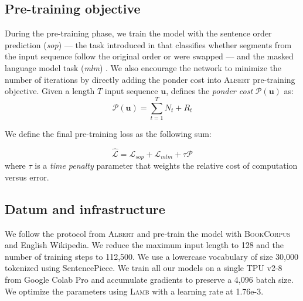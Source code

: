 \subsection{Pre-training objective}

During the pre-training phase, we train the model with the sentence order prediction (\textit{sop}) — the task introduced in \textcite{lan_20} that classifies whether segments from the input sequence follow the original order or were swapped — and the masked language model task (\textit{mlm}) \parencite{devlin_19}. We also encourage the network to minimize the number of iterations by directly adding the ponder cost into \textsc{Albert}  pre-training objective. Given a length $T$ input sequence $\textbf{u}$,  \textcite{graves_16} defines the \emph{ponder cost} $\mathcal{P}(\textbf{u})$ as:
\begin{equation}
\mathcal{P}(\textbf{u}) = \sum_{t=1}^T N_{t} + R_t \label{eq:ponder-cost}
\end{equation}

We define the final pre-training loss as the following sum:

\begin{equation}
\hat{\mathcal{L}} = \mathcal{L}_{sop} + \mathcal{L}_{mlm} + \tau \mathcal{P} \label{eq:ponder-loss}
\end{equation}
where $\tau$ is a \emph{time penalty} parameter that weights the relative cost of computation versus error.

\subsection{Datum and infrastructure} We follow the protocol from \textsc{Albert} and pre-train the model with \textsc{BookCorpus}~\parencite{zhu_15} and English Wikipedia. We reduce the maximum input length to 128 and the number of training steps to 112,500. We use a lowercase vocabulary of size 30,000 tokenized using SentencePiece. We train all our models on a single TPU v2-8 from Google Colab Pro and accumulate gradients to preserve a 4,096 batch size. We optimize the parameters using \textsc{Lamb} with a learning rate at 1.76e-3.

